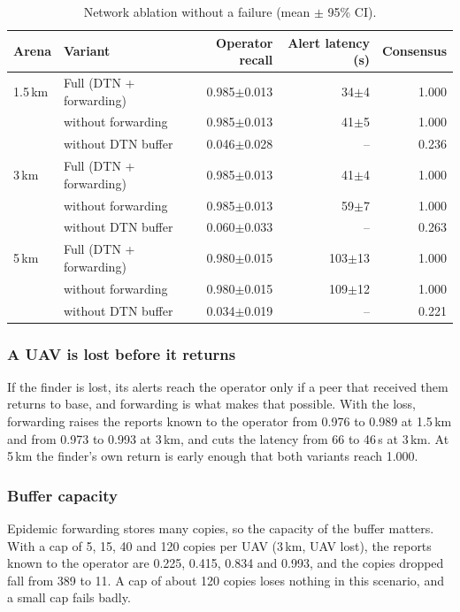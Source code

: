 \documentclass[10pt,letterpaper]{article}
\begin{document}
\begin{table}[H]
\centering\small
\caption{Network ablation without a failure (mean $\pm$ 95\% CI).}\label{tab:net}
\begin{tabular}{llrrr}
\toprule
Arena & Variant & Operator recall & Alert latency (s) & Consensus\\
\midrule
1.5\,km & Full (DTN + forwarding) & 0.985$\pm$0.013 & 34$\pm$4 & 1.000\\
 & without forwarding & 0.985$\pm$0.013 & 41$\pm$5 & 1.000\\
 & without DTN buffer & 0.046$\pm$0.028 & -- & 0.236\\
3\,km & Full (DTN + forwarding) & 0.985$\pm$0.013 & 41$\pm$4 & 1.000\\
 & without forwarding & 0.985$\pm$0.013 & 59$\pm$7 & 1.000\\
 & without DTN buffer & 0.060$\pm$0.033 & -- & 0.263\\
5\,km & Full (DTN + forwarding) & 0.980$\pm$0.015 & 103$\pm$13 & 1.000\\
 & without forwarding & 0.980$\pm$0.015 & 109$\pm$12 & 1.000\\
 & without DTN buffer & 0.034$\pm$0.019 & -- & 0.221\\
\bottomrule
\end{tabular}
\end{table}

\subsubsection*{A UAV is lost before it returns}
If the finder is lost, its alerts reach the operator only if a peer that received them returns to base, and forwarding is what makes that possible. With the loss, forwarding raises the reports known to the operator from 0.976 to 0.989 at 1.5\,km and from 0.973 to 0.993 at 3\,km, and cuts the latency from 66 to 46\,s at 3\,km. At 5\,km the finder's own return is early enough that both variants reach 1.000.

\subsubsection*{Buffer capacity}
Epidemic forwarding stores many copies, so the capacity of the buffer matters. With a cap of 5, 15, 40 and 120 copies per UAV (3\,km, UAV lost), the reports known to the operator are 0.225, 0.415, 0.834 and 0.993, and the copies dropped fall from 389 to 11. A cap of about 120 copies loses nothing in this scenario, and a small cap fails badly.
\end{document}
